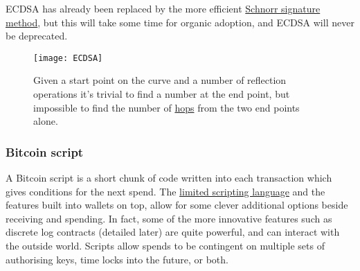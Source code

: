 ECDSA has already been replaced by the more efficient \href{schnorr1989efficient}{Schnorr signature method}, but this will take some time for organic adoption, and ECDSA will never be deprecated.\par
\begin{figure}
  \centering
    \texttt{[image: ECDSA]}
  \caption{Given a start point on the curve and a number of reflection operations it's trivial to find a number at the end point, but impossible to find the number of \href{https://medium.com/coinmonks/introduction-to-blockchains-bedrock-the-elliptic-curve-secp256k1-e4bd3bc17d}{hops} from the two end points alone.}
  \label{fig:ECDSA}
\end{figure}
\subsubsection{Bitcoin script}
A Bitcoin script is a short chunk of code written into each transaction which gives conditions for the next spend. The \href{https://bitcoin.sipa.be/miniscript/}{limited scripting language} and the features built into wallets on top, allow for some clever additional options beside receiving and spending. In fact, some of the more innovative features such as discrete log contracts (detailed later) are quite powerful, and can interact with the outside world. Scripts allow spends to be contingent on multiple sets of authorising keys, time locks into the future, or both.\par

